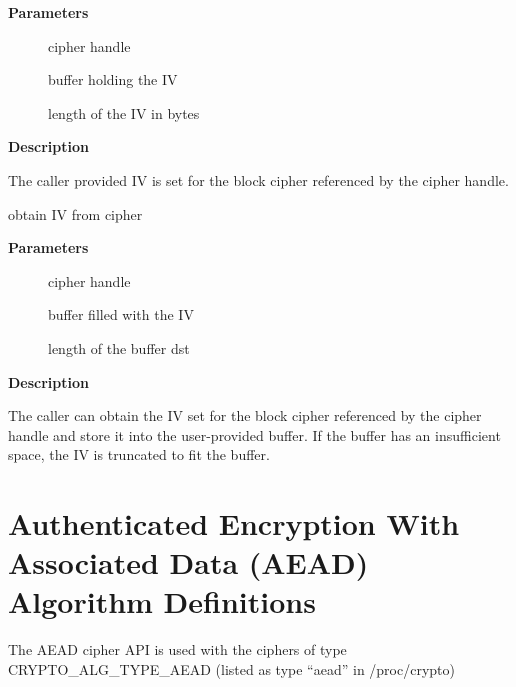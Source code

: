 \documentclass[a4paper,8pt,english]{sphinxmanual}
\begin{document}
\textbf{Parameters}
\begin{description}
\item[{}] \leavevmode
cipher handle

\item[{}] \leavevmode
buffer holding the IV

\item[{}] \leavevmode
length of the IV in bytes

\end{description}

\textbf{Description}

The caller provided IV is set for the block cipher referenced by the cipher
handle.

\begin{fulllineitems}
\label{crypto/api-skcipher:c.crypto_blkcipher_get_iv}
obtain IV from cipher

\end{fulllineitems}


\textbf{Parameters}
\begin{description}
\item[{}] \leavevmode
cipher handle

\item[{}] \leavevmode
buffer filled with the IV

\item[{}] \leavevmode
length of the buffer dst

\end{description}

\textbf{Description}

The caller can obtain the IV set for the block cipher referenced by the
cipher handle and store it into the user-provided buffer. If the buffer
has an insufficient space, the IV is truncated to fit the buffer.


\section{Authenticated Encryption With Associated Data (AEAD) Algorithm Definitions}
\label{crypto/api-aead::doc}\label{crypto/api-aead:authenticated-encryption-with-associated-data-aead-algorithm-definitions}
The AEAD cipher API is used with the ciphers of type CRYPTO\_ALG\_TYPE\_AEAD
(listed as type ``aead'' in /proc/crypto)
\end{document}

